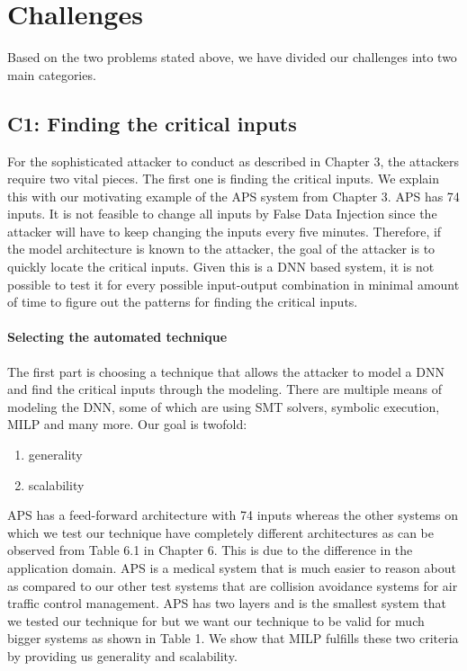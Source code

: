 \chapter{Challenges}
Based on the two problems stated above, we have divided our challenges into two main categories. 
\section{\textbf{C1}: Finding the critical inputs}
For the sophisticated attacker to conduct \attack as described in Chapter 3, the attackers require two vital pieces. The first one is finding the critical inputs. We explain this with our motivating example of the APS system from Chapter 3. APS has 74 inputs. It is not feasible to change all inputs by False Data Injection since the attacker will have to keep changing the inputs every five minutes. Therefore, if the model architecture is known to the attacker, the goal of the attacker is to quickly locate the critical inputs. Given this is a DNN based system, it is not possible to test it for every possible input-output combination in minimal amount of time to figure out the patterns for finding the critical inputs. 

\subsubsection*{Selecting  the automated technique}
The first part is choosing a technique that allows the attacker to model a DNN and find the critical inputs through the modeling. There are multiple means of modeling the DNN, some of which are using SMT solvers, symbolic execution, MILP and many more. 
Our goal is twofold: 
\begin{enumerate}
    \item generality
    \item scalability
\end{enumerate}

APS has a  feed-forward architecture with 74 inputs whereas the other systems on which we test our technique have completely different architectures as can be observed from Table 6.1 in Chapter 6. This is due to the difference in the application domain. APS is a medical system that is much easier to reason about as compared to our other test systems that are collision avoidance systems for air traffic control management.
APS has two layers and is the smallest system that we tested our technique for but we want our technique to be valid for much bigger systems as shown in Table 1. We show that MILP fulfills these two criteria by providing us generality and scalability. 



